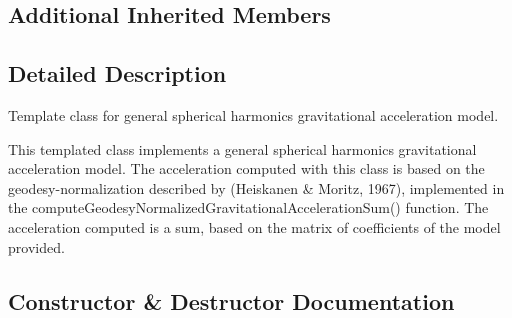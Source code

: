 \subsection*{Additional Inherited Members}


\subsection{Detailed Description}
Template class for general spherical harmonics gravitational acceleration model. 

This templated class implements a general spherical harmonics gravitational acceleration model. The acceleration computed with this class is based on the geodesy-\/normalization described by (Heiskanen \& Moritz, 1967), implemented in the compute\+Geodesy\+Normalized\+Gravitational\+Acceleration\+Sum() function. The acceleration computed is a sum, based on the matrix of coefficients of the model provided. 

\subsection{Constructor \& Destructor Documentation}
